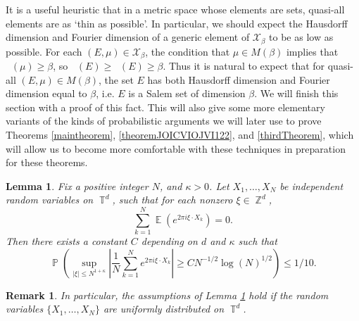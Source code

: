 \documentclass[dvipsnames,letterpaper,12pt]{article}
\numberwithin{equation}{section}
\DeclareMathOperator{\hausdim}{\dim_{\mathbb{H}}}
\DeclareMathOperator{\fordim}{\dim_{\mathbb{F}}}
\DeclareMathOperator{\ZZ}{\mathbb{Z}}
\DeclareMathOperator{\TT}{\mathbb{T}}
\newtheorem{lemma}[theorem]{Lemma}
\newtheorem{remark}[theorem]{Remark}
\numberwithin{theorem}{section}
\DeclareMathOperator{\EE}{\mathbb{E}}
\DeclareMathOperator{\PP}{\mathbb{P}}
\begin{document}
It is a useful heuristic that in a metric space whose elements are sets, quasi-all elements are as `thin as possible'. In particular, we should expect the Hausdorff dimension and Fourier dimension of a generic element of $\mathcal{X}_\beta$ to be as low as possible. For each $(E,\mu) \in \mathcal{X}_\beta$, the condition that $\mu \in M(\beta)$ implies that $\fordim(\mu) \geq \beta$, so $\hausdim(E) \geq \fordim(E) \geq \beta$. Thus it is natural to expect that for quasi-all $(E,\mu) \in M(\beta)$, the set $E$ has both Hausdorff dimension and Fourier dimension equal to $\beta$, i.e. $E$ is a Salem set of dimension $\beta$. We will finish this section with a proof of this fact. This will also give some more elementary variants of the kinds of probabilistic arguments we will later use to prove Theorems \ref{maintheorem}, \ref{theoremJOICVIOJVI122}, and \ref{thirdTheorem}, which will allow us to become more comfortable with these techniques in preparation for these theorems.

\begin{lemma} \label{LemmaGISCICS1}
    Fix a positive integer $N$, and $\kappa > 0$. Let $X_1, \dots, X_N$ be independent random variables on $\TT^d$, such that for each nonzero $\xi \in \ZZ^d$,
    \begin{equation} \label{equatioNVVVVSXXJVU1132}
        \sum_{k = 1}^N \EE \left( e^{2 \pi i \xi \cdot X_k} \right) = 0.
    \end{equation}
    Then there exists a constant $C$ depending on $d$ and $\kappa$ such that
    \[ \PP \left( \sup_{|\xi| \leq N^{1 + \kappa}} \left| \frac{1}{N} \sum_{k = 1}^N e^{2 \pi i \xi \cdot X_k} \right| \geq C N^{-1/2} \log(N)^{1/2} \right) \leq 1/10. \]
\end{lemma}

\begin{remark}
    In particular, the assumptions of Lemma \ref{LemmaGISCICS1} hold if the random variables $\{ X_1,\dots, X_N \}$ are uniformly distributed on $\TT^d$.
\end{remark}
\end{document}
